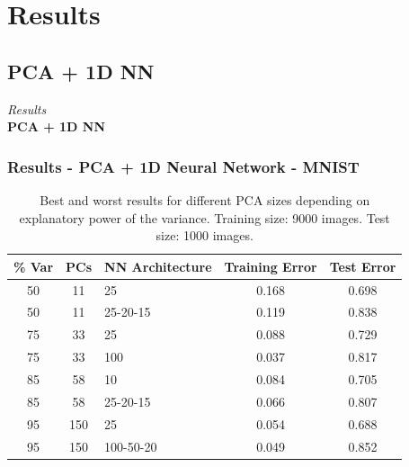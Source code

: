 \documentclass{beamer}
\begin{document}
\section{Results}

\subsection{PCA + 1D NN}

\begin{frame}[standout]
	\centering
	\textit{Results}\\
	\vspace{2em}
	\textbf{PCA + 1D NN}
\end{frame}

\begin{frame}
\frametitle{Results - PCA + 1D Neural Network - MNIST}
\begin{table}[hbt]
  \begin{tabular}{|cc|l|c|c|}
  	\hline
    \% Var & PCs & NN Architecture & Training Error & Test Error \\
    \hline
    \hline
    50 & 11 & 25 & 0.168   &  0.698 \\
    50 & 11 & 25-20-15 & 0.119  &   0.838  \\
    \hline
    75 & 33 & 25 & 0.088  &   0.729 \\
    75 & 33 & 100 &    0.037  &   0.817\\
    \hline
    85 & 58 & 10 & 0.084  &   0.705\\
    85 & 58 & 25-20-15 & 0.066  &   0.807\\
    \hline
    95 & 150 & 25 &  0.054   &  0.688\\
    95 & 150 & 100-50-20 & 0.049   &  0.852\\
    \hline
  \end{tabular}
  \vspace{1em}
  \caption{Best and worst results for different PCA sizes depending on explanatory power of the variance. Training size: 9000 images. Test size: 1000 images.}
\end{table}
\end{frame}
\end{document}

